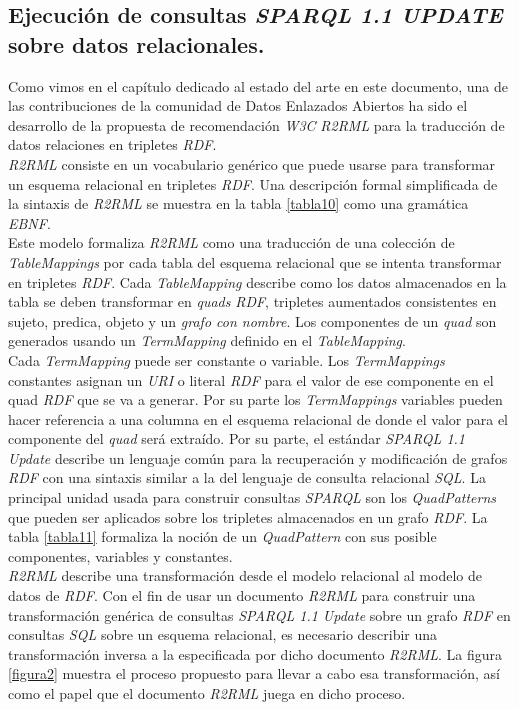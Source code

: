\subsection{Ejecuci\'on de consultas \textit{SPARQL 1.1 UPDATE} sobre datos relacionales.}

Como vimos en el cap\'itulo dedicado al estado del arte en este documento, una de las contribuciones de la comunidad de Datos Enlazados Abiertos ha sido el desarrollo de la propuesta de recomendaci\'on \textit{W3C} \textit{R2RML} \cite{r2rml} para la traducci\'on de datos relaciones en tripletes \textit{RDF}.\\
\textit{R2RML} consiste en un vocabulario gen\'erico que puede usarse para transformar un esquema relacional en tripletes \textit{RDF}. Una descripci\'on formal simplificada de la sintaxis de \textit{R2RML} se muestra en la tabla \ref{tabla10} como una gram\'atica \textit{EBNF}.\\
Este modelo formaliza \textit{R2RML} como una traducci\'on de una colecci\'on de \textit{TableMappings} por cada tabla del esquema relacional que se intenta transformar en tripletes \textit{RDF}. Cada \textit{TableMapping} describe como los datos almacenados en la tabla se deben transformar en \textit{quads} \textit{RDF}, tripletes aumentados consistentes en sujeto, predica, objeto y un \textit{grafo con nombre}. Los componentes de un \textit{quad} son generados usando un \textit{TermMapping} definido en el \textit{TableMapping}.\\
Cada \textit{TermMapping} puede ser constante o variable. Los \textit{TermMappings} constantes asignan un \textit{URI} o literal \textit{RDF} para el valor de ese componente en el quad \textit{RDF} que se va a generar. Por su parte los \textit{TermMappings} variables pueden hacer referencia a una columna en el esquema relacional de donde el valor para el componente del \textit{quad} ser\'a extra\'ido.
Por su parte, el est\'andar \textit{SPARQL 1.1 Update} describe un lenguaje com\'un para la recuperaci\'on y modificaci\'on de grafos \textit{RDF} con una sintaxis similar a la del lenguaje de consulta relacional \textit{SQL}. La principal unidad usada para construir consultas \textit{SPARQL} son los \textit{QuadPatterns} que pueden ser aplicados sobre los tripletes almacenados en un grafo \textit{RDF}. La tabla \ref{tabla11} formaliza la noci\'on de un \textit{QuadPattern} con sus posible componentes, variables y constantes.\\
\textit{R2RML} describe una transformaci\'on desde el modelo relacional al modelo de datos de \textit{RDF}. Con el fin de usar un documento \textit{R2RML} para construir una transformaci\'on gen\'erica de consultas \textit{SPARQL 1.1 Update} sobre un grafo \textit{RDF} en consultas \textit{SQL} sobre un esquema relacional, es necesario describir una transformaci\'on inversa a la especificada por dicho documento \textit{R2RML}. La figura \ref{figura2} muestra el proceso propuesto para llevar a cabo esa transformaci\'on, as\'i como el papel que el documento \textit{R2RML} juega en dicho proceso.\\
